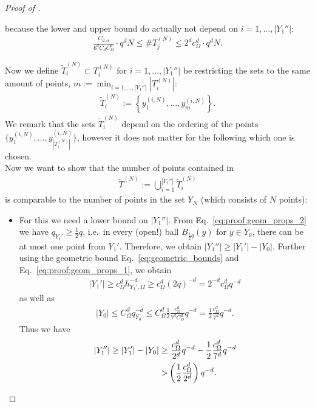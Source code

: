 \documentclass[a4paper, 10pt]{article}
\begin{document}
\begin{proof}[Proof of ]
\begin{itemize}
because the lower and upper bound do actually not depend on $i = 1, ..., |Y_1''|$:
\begin{align}
\label{eq:subset_size_asymp}
\frac{C_{d, \alpha}}{6^d C_d C_\Omega^d} \cdot q^d N \leq 
\#T_j^{(N)} 
\leq 2^d c_\Omega^d \cdot q^d N.
\end{align}
\end{itemize}
Now we define $\tilde{T}_i^{(N)} \subset T_i^{(N)}$ for $i=1, ..., |Y_1''|$ be restricting the sets to the same amount of points, $m := \min_{i=1, ..., |Y_1''|} |T_i^{(N)}|$:
\begin{align}
\label{eq:proof:definition_TiN_tilde}
\tilde{T}_i^{(N)} := \left\{ y_1^{(i, N)}, ..., y_m^{(i, N)} \right\}.
\end{align}
We remark that the sets $\tilde{T}_i^{(N)}$ depend on the ordering of the points $\{ y_1^{(i, N)}, ..., y_{|T_i^{(N)}|}^{(i, N)} \}$, however it does not matter for the following which one is chosen. \\
Now we want to show that the number of points contained in 
\begin{align*}
\tilde{T}^{(N)} := \bigcup_{i=1}^{|Y_1''|} \tilde{T}_i^{(N)}
\end{align*}
is comparable to the number of points in the set $Y_N$ (which consists of $N$ points):
\begin{itemize}
\item For this we need a lower bound on $|Y_1''|$.
From Eq.\ \eqref{eq:proof:geom_props_2} we have $q_{Y_1'} \geq \frac{1}{2}q$, i.e.\ in every (open!) ball $B_{\frac{1}{2} q}(y)$ for $y \in Y_0$, there can be at most one point from $Y_1'$.
Therefore, we obtain $|Y_1''| \geq |Y_1'| - |Y_0|$.
Further using the geometric bound Eq.~\eqref{eq:geometric_bounds} and Eq.~\eqref{eq:proof:geom_props_1}, we obtain
\begin{align*}
|Y_1'| \geq c_\Omega^{d} h_{Y_1', \Omega}^{-d} \geq c_\Omega^d (2q)^{-d} = 2^{-d} c_\Omega^d q^{-d} 
%
\end{align*}
as well as
\begin{align*}
|Y_0| \leq C_\Omega^d q_{Y_0}^{-d} \leq C_\Omega^d \frac{1}{2} \frac{c_\Omega^d}{7^d C_\Omega^d} q^{-d} 
= \frac{1}{2} \frac{c_\Omega^d}{7^d} q^{-d}.
\end{align*}
Thus we have
\begin{align}
\label{eq:lower_bound_Y1''}
|Y_1''| \geq |Y_1'| - |Y_0| \geq& ~ \frac{c_\Omega^d}{2^d} q^{-d} - \frac{1}{2} \frac{c_\Omega^d}{7^d} q^{-d} \notag \\
>& \left( \frac{1}{2} \frac{c_\Omega^d}{2^d} \right) q^{-d}.

\end{align}
\end{itemize}
\end{proof}
\end{document}

